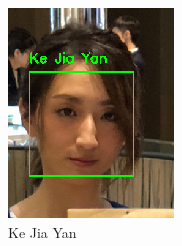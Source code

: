 \begin{figure}[!htb]
  \centering
  \begin{subfigure}[b]{0.3\linewidth}
    \includegraphics[width=\linewidth]{figures/false-recog-correct1.png}
    \caption{Ke Jia Yan}
  \end{subfigure}
  \begin{subfigure}[b]{0.3\linewidth}

\end{subfigure}
\end{figure}

